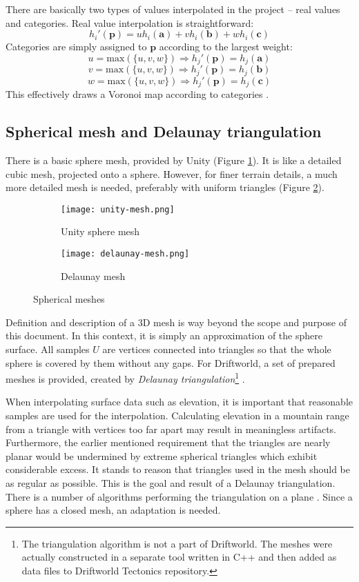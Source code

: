 There are basically two types of values interpolated in the project -- real values and categories. Real value interpolation is straightforward:
$$h_i'(\mathbf{p})=uh_i(\mathbf{a})+vh_i(\mathbf{b})+wh_i(\mathbf{c})$$
Categories are simply assigned to $\mathbf{p}$ according to the largest weight:
$$u=\mbox{max}(\{u,v,w\})\Rightarrow h_j'(\mathbf{p})=h_j(\mathbf{a})$$
$$v=\mbox{max}(\{u,v,w\})\Rightarrow h_j'(\mathbf{p})=h_j(\mathbf{b})$$
$$w=\mbox{max}(\{u,v,w\})\Rightarrow h_j'(\mathbf{p})=h_j(\mathbf{c})$$
This effectively draws a Voronoi map according to categories \cite{voronoi}.
\subsection{Spherical mesh and Delaunay triangulation}
There is a basic sphere mesh, provided by Unity (Figure \ref{fig:unity-mesh}). It is like a detailed cubic mesh, projected onto a sphere. However, for finer terrain details, a much more detailed mesh is needed, preferably with uniform triangles (Figure \ref{fig:delaunay-mesh}).

\begin{figure}[ht]
\centering
\begin{subfigure}{7cm}
\texttt{[image: unity-mesh.png]}
\caption{Unity sphere mesh}
\label{fig:unity-mesh}
\end{subfigure}
\hspace*{1cm}
\begin{subfigure}{7cm}
\texttt{[image: delaunay-mesh.png]}
\caption{Delaunay mesh}
\label{fig:delaunay-mesh}
\end{subfigure}
\caption{Spherical meshes}
\label{fig:spherical-mesh}
\end{figure}
Definition and description of a 3D mesh is way beyond the scope and purpose of this document. In this context, it is simply an approximation of the sphere surface. All samples $U$ are vertices connected into triangles so that the whole sphere is covered by them without any gaps. For Driftworld, a set of prepared meshes is provided, created by \textit{Delaunay triangulation}\footnote{The triangulation algorithm is not a part of Driftworld. The meshes were actually constructed in a separate tool written in C++ and then added as data files to Driftworld Tectonics repository.} \cite{delaunay}.

When interpolating surface data such as elevation, it is important that reasonable samples are used for the interpolation. Calculating elevation in a mountain range from a triangle with vertices too far apart may result in meaningless artifacts. Furthermore, the earlier mentioned requirement that the triangles are nearly planar would be undermined by extreme spherical triangles which exhibit considerable excess. It stands to reason that triangles used in the mesh should be as regular as possible. This is the goal and result of a Delaunay triangulation. There is a number of algorithms performing the triangulation on a plane \cite{knuth}. Since a sphere has a closed mesh, an adaptation is needed.


